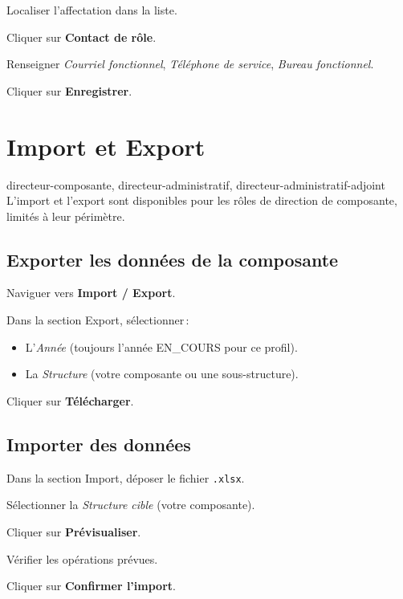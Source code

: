 \begin{steps}
  \item Localiser l'affectation dans la liste.
  \item Cliquer sur \textbf{Contact de r\^ole}.
  \item Renseigner \textit{Courriel fonctionnel}, \textit{T\'el\'ephone de service}, \textit{Bureau fonctionnel}.
  \item Cliquer sur \textbf{Enregistrer}.
\end{steps}

\section{Import et Export}

\begin{rolebox}{directeur-composante, directeur-administratif, directeur-administratif-adjoint}
  L'import et l'export sont disponibles pour les r\^oles de direction de composante, limit\'es \`a leur p\'erim\`etre.
\end{rolebox}

\subsection{Exporter les donn\'ees de la composante}

\begin{steps}
  \item Naviguer vers \textbf{Import / Export}.
  \item Dans la section Export, s\'electionner\,:
    \begin{itemize}
      \item L'\textit{Ann\'ee} (toujours l'ann\'ee EN\_COURS pour ce profil).
      \item La \textit{Structure} (votre composante ou une sous-structure).
    \end{itemize}
  \item Cliquer sur \textbf{T\'el\'echarger}.
\end{steps}

\subsection{Importer des donn\'ees}

\begin{steps}
  \item Dans la section Import, d\'eposer le fichier \texttt{.xlsx}.
  \item S\'electionner la \textit{Structure cible} (votre composante).
  \item Cliquer sur \textbf{Pr\'evisualiser}.
  \item V\'erifier les op\'erations pr\'evues.
  \item Cliquer sur \textbf{Confirmer l'import}.
\end{steps}

